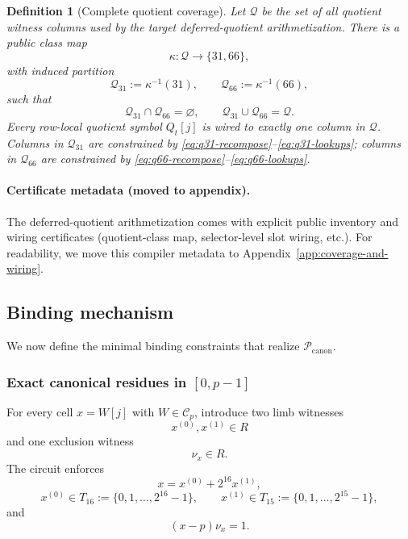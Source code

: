 ﻿\documentclass[11pt]{article}
\newtheorem{definition}[theorem]{Definition}
\newcommand{\Cset}{\mathcal{C}}
\begin{document}
\begin{definition}[Complete quotient coverage]
\label{def:complete-quotient-coverage}
Let \(\mathcal Q\) be the set of all quotient witness columns used by the
target deferred-quotient arithmetization. There is a public class map
\[
\kappa:\mathcal Q \to \{31,66\},
\]
with induced partition
\[
\mathcal Q_{31}:=\kappa^{-1}(31),\qquad
\mathcal Q_{66}:=\kappa^{-1}(66),
\]
such that
\[
\mathcal Q_{31}\cap\mathcal Q_{66}=\varnothing,\qquad
\mathcal Q_{31}\cup\mathcal Q_{66}=\mathcal Q.
\]
Every row-local quotient symbol \(Q_t[j]\) is wired to exactly one column in
\(\mathcal Q\). Columns in \(\mathcal Q_{31}\) are constrained by
\eqref{eq:q31-recompose}--\eqref{eq:q31-lookups}; columns in \(\mathcal Q_{66}\)
are constrained by \eqref{eq:q66-recompose}--\eqref{eq:q66-lookups}.
\end{definition}

\paragraph{Certificate metadata (moved to appendix).}
The deferred-quotient arithmetization comes with explicit public inventory and
wiring certificates (quotient-class map, selector-level slot wiring, etc.). For
readability, we move this compiler metadata to
Appendix~\ref{app:coverage-and-wiring}.

\subsection{Binding mechanism}
\label{subsec:binding-mechanism}

We now define the minimal binding constraints that realize \(\mathcal{P}_{\mathrm{canon}}\).

\subsubsection{Exact canonical residues in \([0,p-1]\)}

For every cell \(x = W[j]\) with \(W\in\Cset_p\), introduce two limb witnesses
\[
x^{(0)},x^{(1)} \in R
\]
and one exclusion witness
\[
\nu_x \in R.
\]
The circuit enforces
\begin{equation}
x = x^{(0)} + 2^{16}x^{(1)},
\label{eq:residue-recompose}
\end{equation}
\begin{equation}
x^{(0)} \in T_{16} := \{0,1,\dots,2^{16}-1\},
\qquad
x^{(1)} \in T_{15} := \{0,1,\dots,2^{15}-1\},
\label{eq:residue-limb-lookups}
\end{equation}
and
\begin{equation}
(x-p)\nu_x = 1.
\label{eq:residue-not-p}
\end{equation}
\end{document}
